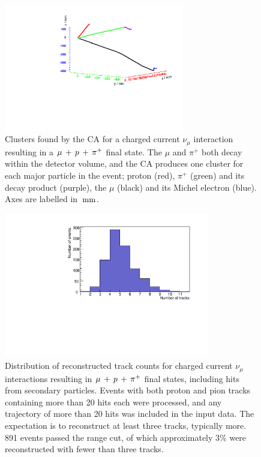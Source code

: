 \begin{figure}
    \centering
    \includegraphics[angle=-90,width=0.7\textwidth]{chapters/cellularautomaton_images/ccpi_bothdecay}
    \caption[Clusters found by the CA in a $\ccpi$ event]{\label{fig:ca-clusters-ccpi}Clusters found by the CA for a charged current $\nu_\mu$ interaction resulting in a $\ccpi$ final state. The $\mu$ and $\pi^+$ both decay within the detector volume, and the CA produces one cluster for each major particle in the event; proton (red), $\pi^+$ (green) and its decay product (purple), the $\mu$ (black) and its Michel electron (blue). Axes are labelled in $\,\mathrm{mm}$.}
\end{figure}

\begin{figure}
    \centering
    \includegraphics[angle=-90,width=0.8\textwidth]{chapters/cellularautomaton_images/ccpi-trackcounts}
    \caption[Number of reconstructed tracks in \acs{CCPi} events]{\label{fig:ca-ccpi-trackcounts}Distribution of reconstructed track counts for charged current $\nu_\mu$ interactions resulting in $\ccpi$ final states, including hits from secondary particles. Events with both proton and pion tracks containing more than 20 hits each were processed, and any trajectory of more than 20 hits was included in the input data. The expectation is to reconstruct at least three tracks, typically more. 891 events passed the range cut, of which approximately $3\%$ were reconstructed with fewer than three tracks.}
\end{figure}

